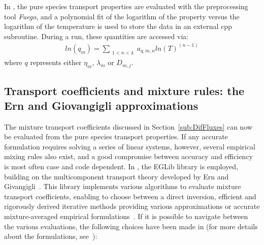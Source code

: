 In \pelelm, \; the pure species transport properties are evaluated with the preprocessing tool \emph{Fuego}, and a polynomial fit of the logarithm of the property versus the logarithm of the temperature is used to store the data in an external cpp subroutine. During a \pelelm \; run, these quantities are accessed via:
\begin{eqnarray}
ln(q_m) = \sum_{\substack{1<n<4}} a_{q,m,n} ln(T)^{(n-1)} 
\end{eqnarray}
where $q$ represents either $\eta_m$, $\lambda_m$ or $D_{m,j}$.


\subsection{Transport coefficients and mixture rules: the Ern and Giovangigli approximations}
\label{subs:EGLIB}
The mixture transport coefficients discussed in Section~\ref{sub:DifFluxes} can now be evaluated from the pure species transport properties. If any accurate formulation requires solving a series of linear systems, however, several empirical mixing rules also exist, and a good compromise between accuracy and efficiency is most often case and code dependent. In \pelelm, the EGLib library is employed, building on the multicomponent transport theory developed by Ern and Givangigli~\cite{Ern:1994}. This library implements various algorithms to evaluate mixture transport coefficients, enabling to choose between a direct inversion, efficient and rigorously derived iterative methods providing various approximations or accurate mixture-averaged empirical formulations~\cite{Ern:2004}. If it is possible to navigate between the various evaluations, the following choices have been made in \pelelm \;(for more details about the formulations, see~\cite{Ern:1994,Ern:2004}):

